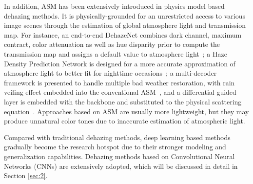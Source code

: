 \documentclass[lettersize,journal]{IEEEtran}
\begin{document}
In addition, ASM has been extensively introduced in physics model based dehazing methods. It is physically-grounded for an unrestricted access to various image scenes through the estimation of global atmosphere light and transmission map. For instance, an end-to-end DehazeNet combines dark channel, maximum contract, color attenuation as well as hue disparity prior to compute the transmission map and assigns a default value to atmosphere light~\cite{cai2016dehazenet}; a Haze Density Prediction Network is designed for a more accurate approximation of atmosphere light to better fit for nighttime occasions~\cite{liao2018hdp}; a multi-decoder framework is presented to handle multiple bad weather restoration, with rain veiling effect embedded into the conventional ASM~\cite{li2020all}, and a differential guided layer is embedded with the backbone and substituted to the physical scattering equation~\cite{li2020all}. Approaches based on ASM are usually more lightweight, but they may produce unnatural color tones due to inaccurate estimation of atmospheric light.

Compared with traditional dehazing methods, deep learning based methods gradually become the research hotspot due to their stronger modeling and generalization capabilities.  Dehazing methods based on Convolutional Neural Networks (CNNs) are extensively adopted, which will be discussed in detail in Section \ref{sec:2}.  %
\end{document}
